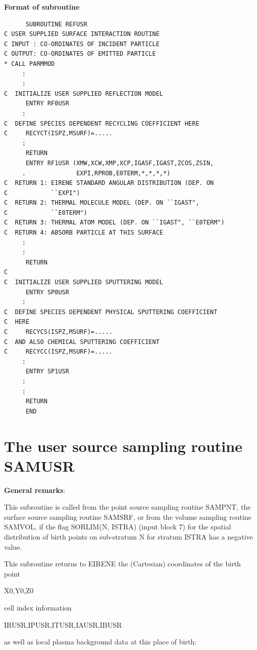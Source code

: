 \medskip

\textbf{Format of subroutine} 

\medskip 

\begin{lstlisting}
      SUBROUTINE REFUSR
C USER SUPPLIED SURFACE INTERACTION ROUTINE
C INPUT : CO-ORDINATES OF INCIDENT PARTICLE
C OUTPUT: CO-ORDINATES OF EMITTED PARTICLE
* CALL PARMMOD
     :
     :
C  INITIALIZE USER SUPPLIED REFLECTION MODEL
      ENTRY RF0USR
     :
C  DEFINE SPECIES DEPENDENT RECYCLING COEFFICIENT HERE
C     RECYCT(ISPZ,MSURF)=.....
     :
      RETURN
      ENTRY RF1USR (XMW,XCW,XMP,XCP,IGASF,IGAST,ZCOS,ZSIN,
     .              EXPI,RPROB,E0TERM,*,*,*,*)
C  RETURN 1: EIRENE STANDARD ANGULAR DISTRIBUTION (DEP. ON 
C            ``EXPI")
C  RETURN 2: THERMAL MOLECULE MODEL (DEP. ON ``IGAST", 
C            ``E0TERM")
C  RETURN 3: THERMAL ATOM MODEL (DEP. ON ``IGAST", ``E0TERM")
C  RETURN 4: ABSORB PARTICLE AT THIS SURFACE
     :
     :
      RETURN
C
C  INITIALIZE USER SUPPLIED SPUTTERING MODEL
      ENTRY SP0USR
     :
C  DEFINE SPECIES DEPENDENT PHYSICAL SPUTTERING COEFFICIENT 
C  HERE
C     RECYCS(ISPZ,MSURF)=.....
C  AND ALSO CHEMICAL SPUTTERING COEFFICIENT
C     RECYCC(ISPZ,MSURF)=.....
     :
      ENTRY SP1USR
     :
     :
      RETURN
      END
\end{lstlisting} 

\newpage 

\section{The user source sampling routine SAMUSR} \label{sec3.4}

\textbf{General remarks}:

\medskip

This subroutine is called from the point source sampling routine SAMPNT, the
surface source sampling routine SAMSRF, or from the volume sampling routine
SAMVOL, if the flag SORLIM(N, ISTRA) (input block 7) for the spatial
distribution of birth points on sub-stratum N for stratum ISTRA has a negative
value.

This subroutine returns to EIRENE the (Cartesian) coordinates of the birth
point 

X0,Y0,Z0 

cell index information 

IRUSR,IPUSR,ITUSR,IAUSR,IBUSR 

as well as local plasma background data at this place of birth:

